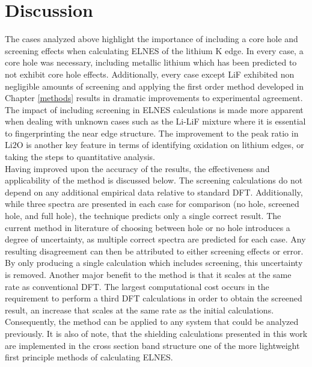 \section{Discussion}
The  cases analyzed above highlight the importance of including a core hole and screening effects when calculating ELNES of the lithium K edge.  In every case, a core hole was necessary, including metallic lithium which has been predicted to not exhibit core hole effects.  Additionally, every case except LiF exhibited non negligible amounts of screening  and applying the first order method developed in Chapter \ref{methods} results in dramatic improvements to experimental agreement.  The impact of including screening in ELNES calculations is made more apparent when dealing with unknown cases such as the Li-LiF mixture where it is essential to fingerprinting the near edge structure.  The improvement to the peak ratio in $ \mathrm{Li2O} $ is another key feature in terms of identifying oxidation on lithium edges, or taking the steps to quantitative analysis.  \\

Having improved upon the accuracy of the results, the effectiveness and applicability of the method is discussed below. The screening calculations do not depend on any additional empirical data relative to standard DFT.  Additionally, while three spectra are presented in each case for comparison (no hole, screened hole, and full hole), the technique predicts only a single correct result.  The current method in literature of choosing between hole or no hole introduces a degree of uncertainty, as multiple correct spectra are predicted for each case.   Any resulting disagreement can then be attributed to either screening effects or error. By only producing a single calculation which includes screening, this uncertainty is removed.  Another major benefit to the method is that it scales at the same rate as conventional DFT.  The largest computational cost occurs in the requirement to perform a third DFT calculations in order to obtain the screened result, an increase that scales at the same rate as the initial calculations.  Consequently, the method can be applied to any system that could be analyzed previously.  It is also of note, that the shielding calculations presented in this work are implemented in the cross section band structure one of the more lightweight first principle methods of calculating ELNES.\\

